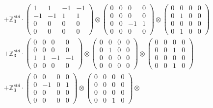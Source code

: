 \documentclass{article}
\begin{document}
{\begin{align}
        &+ \label{Rs1-Rc16-Solution-5-c4} \mathbb{Z}_3^{std} \cdot 
            \begin{pmatrix} 1 & 1 & -1 & -1 \\ -1 & -1 & 1 & 1 \\ 0 & 0 & 0 & 0 \\ 0 & 0 & 0 & 0 \end{pmatrix} \otimes 
            \begin{pmatrix} 0 & 0 & 0 & 0 \\ 0 & 0 & 0 & 0 \\ 0 & 0 & -1 & 1 \\ 0 & 0 & 0 & 0 \end{pmatrix} \otimes 
            \begin{pmatrix} 0 & 0 & 0 & 0 \\ 0 & 1 & 0 & 0 \\ 0 & 0 & 0 & 0 \\ 0 & 1 & 0 & 0 \end{pmatrix} \\ 
        &+ \label{Rs1-Rc16-Solution-5-c5} \mathbb{Z}_3^{std} \cdot 
            \begin{pmatrix} 0 & 0 & 0 & 0 \\ 0 & 0 & 0 & 0 \\ 1 & 1 & -1 & -1 \\ 0 & 0 & 0 & 0 \end{pmatrix} \otimes 
            \begin{pmatrix} 0 & 0 & 0 & 0 \\ 0 & 1 & 0 & 0 \\ 0 & 0 & 0 & 0 \\ 0 & 0 & 0 & 0 \end{pmatrix} \otimes 
            \begin{pmatrix} 0 & 0 & 0 & 0 \\ 0 & 0 & 1 & 0 \\ 0 & 0 & 0 & 0 \\ 0 & 0 & 1 & 0 \end{pmatrix} \\ 
        &+ \label{Rs1-Rc16-Solution-5-c6} \mathbb{Z}_3^{std} \cdot 
            \begin{pmatrix} 0 & 0 & 0 & 0 \\ 0 & -1 & 0 & 1 \\ 0 & 0 & 0 & 0 \\ 0 & 0 & 0 & 0 \end{pmatrix} \otimes 
            \begin{pmatrix} 0 & 0 & 0 & 0 \\ 0 & 0 & 0 & 0 \\ 0 & 0 & 0 & 0 \\ 0 & 0 & 1 & 0 \end{pmatrix} \otimes 

\end{align}}
\end{document}
